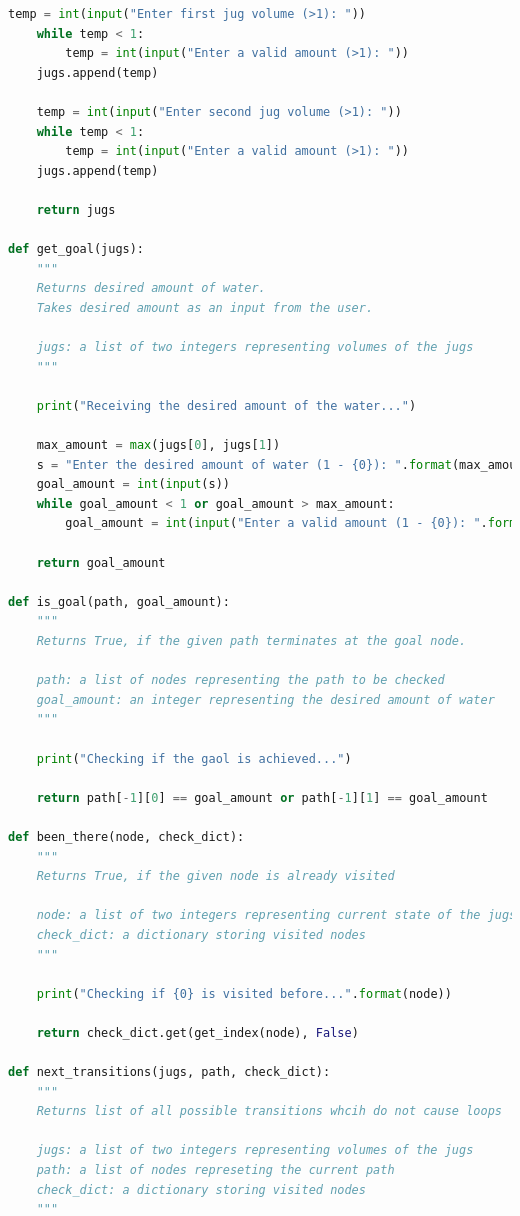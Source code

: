 \documentclass[conference]{IEEEtran}
\begin{document}
\begin{titlepage}
\begin{lstlisting}[language=Python,caption=Code for this paper]
    temp = int(input("Enter first jug volume (>1): "))
    while temp < 1:
        temp = int(input("Enter a valid amount (>1): "))       
    jugs.append(temp)
    
    temp = int(input("Enter second jug volume (>1): "))
    while temp < 1:
        temp = int(input("Enter a valid amount (>1): "))     
    jugs.append(temp)
    
    return jugs

def get_goal(jugs):
    """
    Returns desired amount of water.
    Takes desired amount as an input from the user.
    
    jugs: a list of two integers representing volumes of the jugs
    """

    print("Receiving the desired amount of the water...")

    max_amount = max(jugs[0], jugs[1])
    s = "Enter the desired amount of water (1 - {0}): ".format(max_amount)
    goal_amount = int(input(s))
    while goal_amount < 1 or goal_amount > max_amount:
        goal_amount = int(input("Enter a valid amount (1 - {0}): ".format(max_amount)))
        
    return goal_amount

def is_goal(path, goal_amount):
    """
    Returns True, if the given path terminates at the goal node.
    
    path: a list of nodes representing the path to be checked
    goal_amount: an integer representing the desired amount of water
    """

    print("Checking if the gaol is achieved...")
    
    return path[-1][0] == goal_amount or path[-1][1] == goal_amount

def been_there(node, check_dict):
    """
    Returns True, if the given node is already visited
    
    node: a list of two integers representing current state of the jugs
    check_dict: a dictionary storing visited nodes
    """

    print("Checking if {0} is visited before...".format(node))

    return check_dict.get(get_index(node), False)

def next_transitions(jugs, path, check_dict):
    """
    Returns list of all possible transitions whcih do not cause loops
    
    jugs: a list of two integers representing volumes of the jugs
    path: a list of nodes represeting the current path
    check_dict: a dictionary storing visited nodes
    """


\end{lstlisting}
\end{titlepage}
\end{document}

